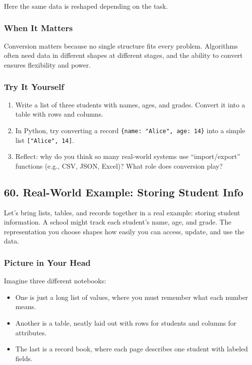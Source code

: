 \documentclass[
  letterpaper,
  DIV=11,
  numbers=noendperiod]{scrreprt}
\providecommand{\tightlist}{%
  \setlength{\itemsep}{0pt}\setlength{\parskip}{0pt}}
\begin{document}
Here the same data is reshaped depending on the task.

\subsubsection{When It Matters}\label{when-it-matters-56}

Conversion matters because no single structure fits every problem.
Algorithms often need data in different shapes at different stages, and
the ability to convert ensures flexibility and power.

\subsubsection{Try It Yourself}\label{try-it-yourself-58}

\begin{enumerate}
\def\labelenumi{\arabic{enumi}.}
\tightlist
\item
  Write a list of three students with names, ages, and grades. Convert
  it into a table with rows and columns.
\item
  In Python, try converting a record
  \texttt{\{name:\ "Alice",\ age:\ 14\}} into a simple list
  \texttt{{[}"Alice",\ 14{]}}.
\item
  Reflect: why do you think so many real-world systems use
  ``import/export'' functions (e.g., CSV, JSON, Excel)? What role does
  conversion play?
\end{enumerate}

\subsection{60. Real-World Example: Storing Student
Info}\label{real-world-example-storing-student-info}

Let's bring lists, tables, and records together in a real example:
storing student information. A school might track each student's name,
age, and grade. The representation you choose shapes how easily you can
access, update, and use the data.

\subsubsection{Picture in Your Head}\label{picture-in-your-head-59}

Imagine three different notebooks:

\begin{itemize}
\tightlist
\item
  One is just a long list of values, where you must remember what each
  number means.
\item
  Another is a table, neatly laid out with rows for students and columns
  for attributes.
\item
  The last is a record book, where each page describes one student with
  labeled fields.
\end{itemize}
\end{document}
